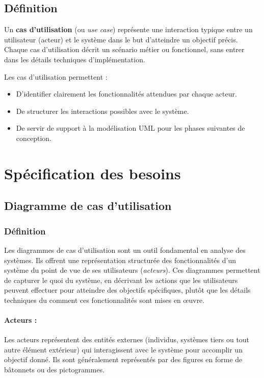 \subsection{Définition}

Un \textbf{cas d’utilisation} (ou \textit{use case}) représente une interaction typique entre un utilisateur (acteur) et le système dans le but d’atteindre un objectif précis. Chaque cas d’utilisation décrit un scénario métier ou fonctionnel, sans entrer dans les détails techniques d’implémentation.

Les cas d’utilisation permettent :
\begin{itemize}
    \item D’identifier clairement les fonctionnalités attendues par chaque acteur.
    \item De structurer les interactions possibles avec le système.
    \item De servir de support à la modélisation UML pour les phases suivantes de conception.
\end{itemize}

\section{Spécification des besoins}

\subsection{Diagramme de cas d’utilisation}

\subsubsection*{Définition}

Les diagrammes de cas d’utilisation sont un outil fondamental en analyse des systèmes. Ils offrent une représentation structurée des fonctionnalités d’un système du point de vue de ses utilisateurs (\textit{acteurs}). Ces diagrammes permettent de capturer le \og quoi \fg{} du système, en décrivant les actions que les utilisateurs peuvent effectuer pour atteindre des objectifs spécifiques, plutôt que les détails techniques du \og comment \fg{} ces fonctionnalités sont mises en œuvre.

\paragraph*{Acteurs :}
Les acteurs représentent des entités externes (individus, systèmes tiers ou tout autre élément extérieur) qui interagissent avec le système pour accomplir un objectif donné. Ils sont généralement représentés par des figures en forme de bâtonnets ou des pictogrammes.

